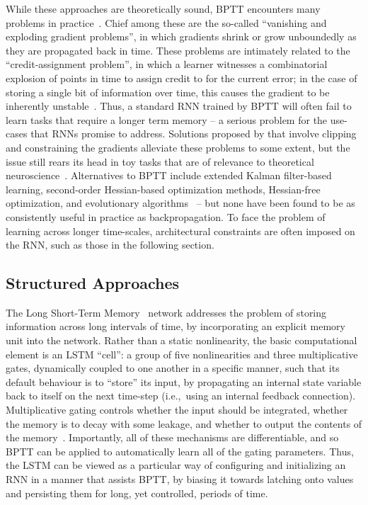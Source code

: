 While these approaches are theoretically sound, BPTT encounters many problems in practice~\citep{bengio1994learning}.
Chief among these are the so-called ``vanishing and exploding gradient problems'', in which gradients shrink or grow unboundedly as they are propagated back in time.
These problems are intimately related to the ``credit-assignment problem'', in which a learner witnesses a combinatorial explosion of points in time to assign credit to for the current error; in the case of storing a single bit of information over time, this causes the gradient to be inherently unstable~\citep{bengio1994credit}.
Thus, a standard RNN trained by BPTT will often fail to learn tasks that require a longer term memory -- a serious problem for the use-cases that RNNs promise to address.
Solutions proposed by \citet{pascanu2013difficulty} that involve clipping and constraining the gradients alleviate these problems to some extent, but the issue still rears its head in toy tasks that are of relevance to theoretical neuroscience~\citep{depasquale2018full}.
Alternatives to BPTT include extended Kalman filter-based learning, second-order Hessian-based optimization methods, Hessian-free optimization, and evolutionary algorithms~\citep{salehinejad2017recent} -- but none have been found to be as consistently useful in practice as backpropagation.
To face the problem of learning across longer time-scales, architectural constraints are often imposed on the RNN, such as those in the following section.

\subsection{Structured Approaches}

The Long Short-Term Memory~\citep[LSTM;][]{hochreiter1997long} network addresses the problem of storing information across long intervals of time, by incorporating an explicit memory unit into the network.
Rather than a static nonlinearity, the basic computational element is an LSTM ``cell'': a group of five nonlinearities and three multiplicative gates, dynamically coupled to one another in a specific manner, such that its default behaviour is to ``store'' its input, by propagating an internal state variable back to itself on the next time-step (i.e.,~using an internal feedback connection).
Multiplicative gating controls whether the input should be integrated, whether the memory is to decay with some leakage, and whether to output the contents of the memory~\citep{gers1999learning}.
Importantly, all of these mechanisms are differentiable, and so BPTT can be applied to automatically learn all of the gating parameters.
Thus, the LSTM can be viewed as a particular way of configuring and initializing an RNN in a manner that assists BPTT, by biasing it towards latching onto values and persisting them for long, yet controlled, periods of time.

